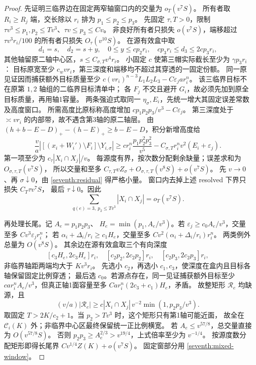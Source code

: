 \begin{proof}
先证明三临界边在固定两窄轴窗口内的交量为 \(o_T(v^7S)\)。
所有者取 \(R_i\ge R_j\) 端，交长除以 \(r_i\) 排为 \(p_1\le p_2\le p_3\)。
先固定 \(\tau,T>0\)，限制
\(\tau v^3\le p_1,p_2\le Tv^3\)、\(\tau v\le p_3\le Cv\)。
非良好所有者只损失 \(o(v^7S)\)，端移超过
\(\tau v^3r_i/100\) 的所有者只损失 \(O_\tau(v^{10}S)\)。
在源有效盒中取
\[
 d_1=s,\quad d_2=s+y,\quad 0\le y\le cp_2r_i,\quad
 cp_3r_i\le d_3\le2cp_3r_i,
\]
其他轴留原二轴中心区，\(s\le C_{\sigma,T}v^4r_i\)。
小固定 \(c\) 使第三帽实际截长至少为 \(\gamma p_3r_i\)：
目标原宽至少 \(c_wvr_i\)，第三深度和端移均不超过其穿透的一固定份额。
同一原见证因而捕获额外目标质量至少
\(c(vr_i)^{n-3}L_1L_2L_3-C\varepsilon_j ar_i^n\)。
该三临界目标不在原第 \(1,2\) 轴组的二临界目标清单中；
各 \(F_j\) 不交且避开 \(G_i\)，故必须先加到原全目标质量，再用轴1容量。
两条强迫式取同一 \(\eta_\sigma,E_i\)，先统一增大其固定误差常数及高度窗口。
所需高度比原标称高度增加
\(c p_1p_2p_3/v^3-C\varepsilon_j\)。
第三深度处于 \(\asymp vr_i\) 的内部带，故不遇含第3轴的原二轴层。
由
\((h+b-E-D)_+-(h-E)_+\ge b-E-D\)，积分新增高度给
\[
 \frac va|[(x_i+W_i')\setminus F_i]\setminus Y_{i,\sigma}|\ge
 c r_i^n\frac{p_1p_2^2p_3^2}{v^5}
 -C_{\sigma,T}r_i^nv^2(E_i+\varepsilon_j).
 \]
第一项至少为 \(c_\tau|X_i\cap X_j|/v\)。
每源度有界，按次数分配剩余缺量；误差求和为 \(O_{\sigma,\tau,T}(v^7S)\)，
所以交量和至多
\(C_{\tau,T}vZ_\sigma+O_{\sigma,\tau,T}(v^8S)+o(v^7S)\)。
先 \(v\to0\)、再 \(\sigma\downarrow0\)，由 \eqref{seventh:residual} 得严格小量。
窗口内去掉上述 resolved 下界只损失 \(C_T\tau v^7S\)，
最后 \(\tau\downarrow0\)。因此
\begin{equation}\label{seventh:mixed-window}
 \sum_{q(e)=3,\ p_2\le Tv^3}|X_i\cap X_j|=o_T(v^7S).
\end{equation}

再处理长尾。记 \(A_e=p_1p_2p_3\)、
\(H_e=\min(p_1,A_e/v^3)\)。若
\(\varepsilon_j\ge c_0A_e/v^3\)，交量至多 \(Cv^3\varepsilon_jr_i^n\)；
若 \(\alpha_i+\Delta_i/r_i\ge c_1H_e\)，交量至多
\(Cv^2(\alpha_i+\Delta_i/r_i)r_i^n\)。
两类例外总量为 \(O(v^8S)\)。
其余边在源有效盒取三个有向深度
\[
 [c_3H_e,2c_3H_e]r_i,\quad
 [c_2p_2,2c_2p_2]r_i,\quad[c_2p_3,2c_2p_3]r_i,
\]
非临界轴距两端均大于 \(Kv^3r_i\)。
先选小 \(c_2\)，再选小 \(c_1,c_3\)，使深度在盒内且目标各轴保留固定比例穿透；
最后选 \(c_0\)。若源点存在，同一见证捕获额外目标至少
\(ca r_i^nA_e/v^3\)，但真正轴1面容量至多
\(Ca r_i^n(2c_3+c_1)H_e\)，矛盾。
故整矩形 \(\mathcal R_e\) 均缺源，且
\[
 (v/a)|\mathcal R_e|\ge
 c|X_i\cap X_j|\,v^{-2}\min(1,p_2p_3/v^3).
\]
取固定 \(T>2K/c_2+1\)。当 \(p_2>Tv^3\) 时，这个矩形只有第1轴可能近面，
故全在 \(\mathcal C_i(K)\) 外；非临界中心区最终保留统一正比例横宽。
若 \(A_e\le v^{57/8}\)，总交量直接为 \(O(v^{57/8}S)\)。
否则 \(p_2p_3\ge A_e^{2/3}>v^{19/4}\)，上式倍率至少为 \(v^{-1/4}\)。
按源度数分配矩形即得长尾界 \(Cv^{1/4}Z(K)+o(v^7S)\)。
固定窗部分用 \eqref{seventh:mixed-window}。


\end{proof}
